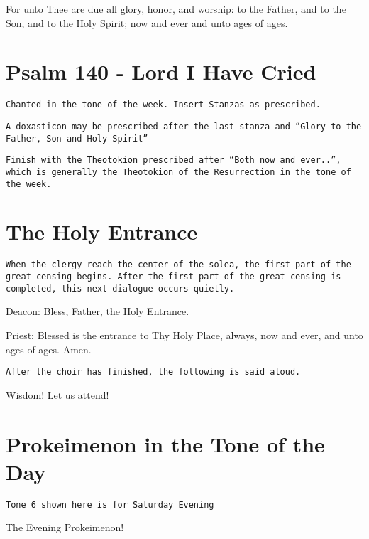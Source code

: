 \documentclass[twoside, letterpaper, 12pt]{report}
\newcommand{\instruction}[1]{%
  \texttt{\scriptsize{#1}}%
}
\newcommand{\centeredsection}[1]{%
  \needspace{10\baselineskip}%
  \section*{\centering{}#1}%
}
\begin{document}

\begin{priest}
\item For unto Thee are due all glory, honor, and worship: to the Father,
    and to the Son, and to the Holy Spirit; now and ever and unto ages of ages.
\end{priest}


\centeredsection{Psalm 140 - Lord I Have Cried}
\instruction{Chanted in the tone of the week. Insert Stanzas as prescribed.}

\vbox{}
\instruction{A doxasticon may be prescribed after the last stanza and
``Glory to the Father, Son and Holy Spirit''}

\vbox{}
\instruction{Finish with the Theotokion prescribed after ``Both now and ever..'',
which is generally the Theotokion of the Resurrection in the tone of the week.
}
\cleardoublepage

\centeredsection{The Holy Entrance}

\instruction{When the clergy reach the center of the solea,
the first part of the great censing begins. After the first part of the great
censing is completed, this next dialogue occurs quietly.}

\vbox{}
{
\footnotesize
Deacon: Bless, Father, the Holy Entrance.

Priest: Blessed is the entrance to Thy Holy Place, always, now and ever, and unto ages of ages. Amen.
}

\vbox{}
\instruction{After the choir has finished, the following is said aloud.}

\begin{deacon}
\item Wisdom! Let us attend!
\end{deacon}


\centeredsection{Prokeimenon in the Tone of the Day}

\instruction{Tone 6 shown here is for Saturday Evening}

\begin{deacon}
    \item The Evening Prokeimenon!
\end{deacon}

\end{document}
